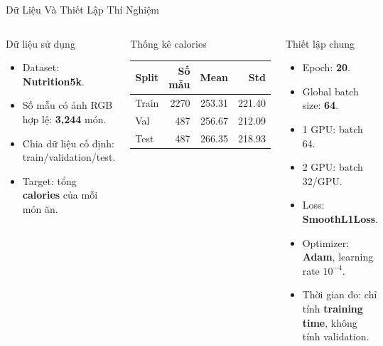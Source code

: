 \documentclass[10pt,aspectratio=169]{beamer}
\newcommand{\highlight}[1]{\textcolor{accent}{\bfseries #1}}
\newcommand{\kw}[1]{\textcolor{uitblue}{\bfseries #1}}
\begin{document}
\begin{frame}{Dữ Liệu Và Thiết Lập Thí Nghiệm}
\scriptsize
\begin{columns}[T]
\begin{uitbox}{Dữ liệu sử dụng}
\begin{itemize}
  \item Dataset: \kw{Nutrition5k}.
  \item Số mẫu có ảnh RGB hợp lệ: \highlight{3,244} món.
  \item Chia dữ liệu cố định: train/validation/test.
  \item Target: tổng \kw{calories} của mỗi món ăn.
\end{itemize}
\end{uitbox}

\vspace{0.12cm}
\begin{greenbox}{Thống kê calories}
\centering
\renewcommand{\arraystretch}{1.12}
\begin{tabular}{lrrr}
\toprule
\textbf{Split} & \textbf{Số mẫu} & \textbf{Mean} & \textbf{Std} \\
\midrule
Train & 2270 & 253.31 & 221.40 \\
Val & 487 & 256.67 & 212.09 \\
Test & 487 & 266.35 & 218.93 \\
\bottomrule
\end{tabular}
\end{greenbox}

\begin{accentbox}{Thiết lập chung}
\begin{itemize}
  \item Epoch: \highlight{20}.
  \item Global batch size: \highlight{64}.
  \item 1 GPU: batch 64.
  \item 2 GPU: batch 32/GPU.
  \item Loss: \kw{SmoothL1Loss}.
  \item Optimizer: \kw{Adam}, learning rate $10^{-4}$.
  \item Thời gian đo: chỉ tính \kw{training time}, không tính validation.
\end{itemize}
\end{accentbox}
\end{columns}
\end{frame}
\end{document}
